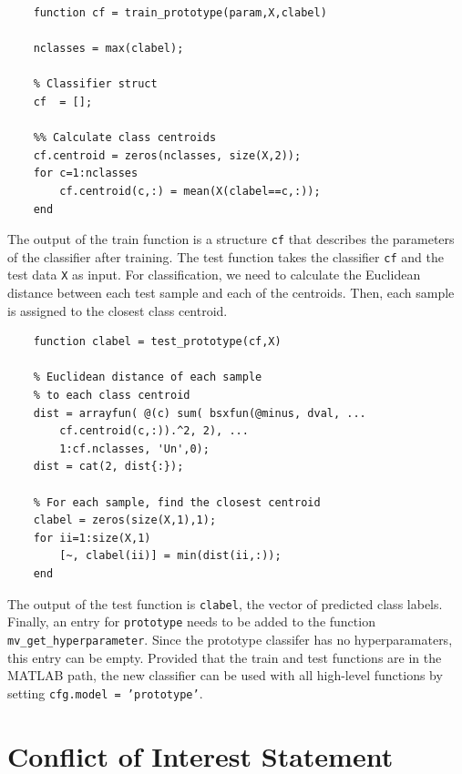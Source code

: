 \documentclass[utf8]{frontiersSCNS} %
\newcommand{\ttt}[1]{\texttt{#1}}
\begin{document}
\begin{verbatim}
    function cf = train_prototype(param,X,clabel)

    nclasses = max(clabel);

    % Classifier struct
    cf  = [];

    %% Calculate class centroids
    cf.centroid = zeros(nclasses, size(X,2));
    for c=1:nclasses
        cf.centroid(c,:) = mean(X(clabel==c,:));
    end
\end{verbatim}

The output of the train function is a structure \ttt{cf} that describes the parameters of the classifier after training. The test function takes the classifier \ttt{cf} and the test data \ttt{X} as input. For classification, we need to calculate the Euclidean distance between each test sample and each of the centroids. Then, each sample is assigned to the closest class centroid.

\begin{verbatim}
    function clabel = test_prototype(cf,X)

    % Euclidean distance of each sample 
    % to each class centroid
    dist = arrayfun( @(c) sum( bsxfun(@minus, dval, ...
        cf.centroid(c,:)).^2, 2), ...
        1:cf.nclasses, 'Un',0);
    dist = cat(2, dist{:});

    % For each sample, find the closest centroid
    clabel = zeros(size(X,1),1);
    for ii=1:size(X,1)
        [~, clabel(ii)] = min(dist(ii,:));
    end

\end{verbatim}

The output of the test function is \ttt{clabel}, the vector of predicted class labels. Finally, an entry for \ttt{prototype} needs to be added to the function \ttt{mv\_get\_hyperparameter}. Since the prototype classifer has no hyperparamaters, this entry can be empty. Provided that the train and test functions are in the MATLAB path, the new classifier can be used with all high-level functions by setting \ttt{cfg.model = 'prototype'}.


\section*{Conflict of Interest Statement}
\end{document}
